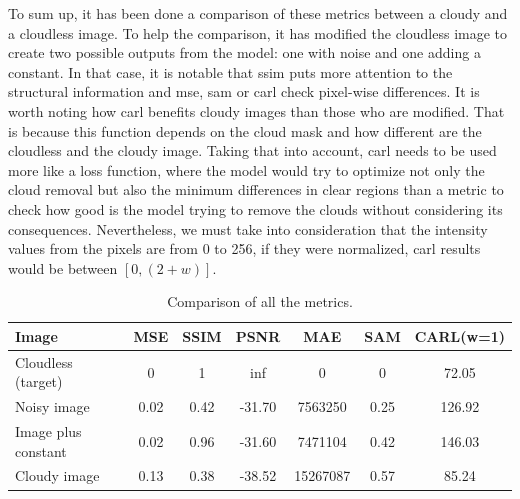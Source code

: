 To sum up, it has been done a comparison of these metrics between a cloudy and a cloudless image. To help the comparison, it has modified the cloudless image to create two possible outputs from the model: one with noise and one adding a constant. In that case, it is notable that \gls{ssim} puts more attention to the structural information and \gls{mse}, \gls{sam} or \gls{carl} check pixel-wise differences. It is worth noting how \gls{carl} benefits cloudy images than those who are modified. That is because this function depends on the cloud mask and how different are the cloudless and the cloudy image. Taking that into account, \gls{carl} needs to be used more like a loss function, where the model would try to optimize not only the cloud removal but also the minimum differences in clear regions than a metric to check how good is the model trying to remove the clouds without considering its consequences. Nevertheless, we must take into consideration that the intensity values from the pixels are from 0 to 256, if they were normalized, \gls{carl} results would be between $[0, (2 + w)]$.
\begin{table}[H]
	\caption{Comparison of all the metrics.}
	\begin{tabular}{l|cccccc}
		Image & MSE & SSIM & PSNR & MAE & SAM & CARL(w=1)\\\hline
		Cloudless (target) & 0 & 1 & inf & 0 & 0 & 72.05\\
		Noisy image & 0.02 & 0.42 &  -31.70 & 7563250 & 0.25 & 126.92\\
		Image plus constant & 0.02 & 0.96 & -31.60 & 7471104 & 0.42 & 146.03\\
		Cloudy image & 0.13 & 0.38 & -38.52 & 15267087 & 0.57 & 85.24\\
	\end{tabular}
\end{table}

